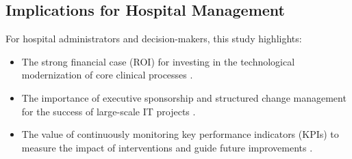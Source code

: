 \subsection{Implications for Hospital Management}

For hospital administrators and decision-makers, this study highlights:
\begin{itemize}
    \item The strong financial case (ROI) for investing in the technological modernization of core clinical processes \cite{rozenblum2020}.
    \item The importance of executive sponsorship and structured change management for the success of large-scale IT projects \cite{may2013}.
    \item The value of continuously monitoring key performance indicators (KPIs) to measure the impact of interventions and guide future improvements \cite{donabedian1988}.
\end{itemize} 